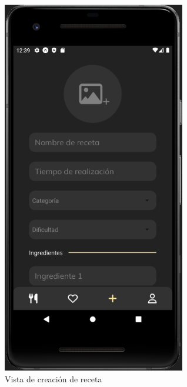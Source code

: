\begin{figure}[!h]
  \centering
  \includegraphics[width=8cm, scale=1]{Images/Imagenes/add1.png}
  \caption{Vista de creación de receta}
  \label{fig:add1}
\end{figure}

